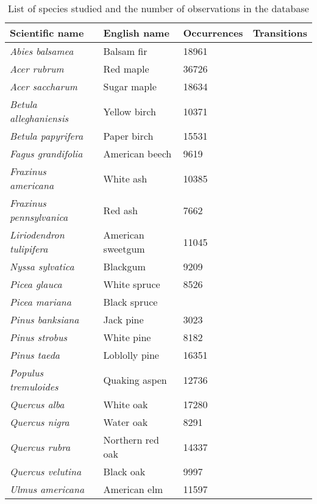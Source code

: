 \begin{table}[tb]
\label{tab:species_list}
\caption{List of species studied and the number of observations in the database}
\begin{tabular}{llll}
\toprule
Scientific name               & English name   & Occurrences & Transitions \\ 
\midrule
{\it Abies balsamea}          & Balsam fir        & 18961       &             \\
{\it Acer rubrum}             & Red maple         & 36726       &             \\
{\it Acer saccharum}          & Sugar maple       & 18634       &             \\
{\it Betula alleghaniensis}   & Yellow birch      & 10371       &             \\
{\it Betula papyrifera}       & Paper birch       & 15531       &             \\
{\it Fagus grandifolia}       & American beech    & 9619        &             \\
{\it Fraxinus americana}      & White ash         & 10385       &             \\
{\it Fraxinus pennsylvanica}  & Red ash           & 7662        &             \\
{\it Liriodendron tulipifera} & American sweetgum & 11045       &             \\
{\it Nyssa sylvatica}         & Blackgum          & 9209        &             \\
{\it Picea glauca}            & White spruce      & 8526        &             \\
{\it Picea mariana}           & Black spruce      &             &             \\
{\it Pinus banksiana}         & Jack pine         & 3023        &             \\
{\it Pinus strobus}           & White pine        & 8182        &             \\
{\it Pinus taeda}             & Loblolly pine     & 16351       &             \\
{\it Populus tremuloides}     & Quaking aspen     & 12736       &             \\ 
{\it Quercus alba}            & White oak         & 17280       &             \\
{\it Quercus nigra}           & Water oak         & 8291        &             \\
{\it Quercus rubra}           & Northern red oak  & 14337       &             \\
{\it Quercus velutina}        & Black oak         & 9997        &             \\
{\it Ulmus americana}         & American elm      & 11597       &             \\ 
\bottomrule
\end{tabular}
\end{table}

